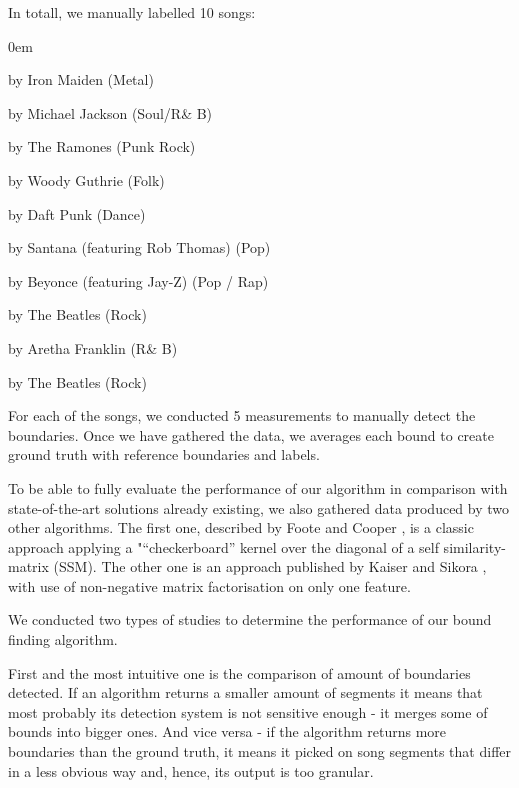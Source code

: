 In totall, we manually labelled 10 songs:
\vspace{-10pt}
\begin{description}
\itemsep0em 
\item[“The Number of The Beast”] by Iron Maiden (Metal)
\item[“Rock With You”] by Michael Jackson (Soul/R\& B)
\item[“Blitzkrieg Bop”] by The Ramones (Punk Rock)
\item[“This Land is Your Land“] by Woody Guthrie (Folk)
\item[“One More Time”] by Daft Punk (Dance)
\item[“Smooth”] by Santana (featuring Rob Thomas) (Pop)
\item[ “Crazy in Love”] by Beyonce (featuring Jay-Z) (Pop / Rap)
\item["Help!"] by The Beatles (Rock)
\item["Respect"] by Aretha Franklin (R\& B)
\item["Back in the USSR"] by The Beatles (Rock)
\end{description}

For each of the songs, we conducted 5 measurements to manually detect the boundaries. Once we have gathered the data, we averages each bound to create ground truth with reference boundaries and labels.

To be able to fully evaluate the performance of our algorithm in comparison with state-of-the-art solutions already existing, we also gathered data produced by two other algorithms. The first one, described by Foote and Cooper \cite{FooteCooper}, is a classic approach applying a "“checkerboard” kernel over the diagonal of a self similarity-matrix (SSM). The other one is an approach published by Kaiser and Sikora \cite{Sikora}, with use of non-negative matrix factorisation on only one feature. 

We conducted two types of studies to determine the performance of our bound finding algorithm.

First and the most intuitive one is the comparison of amount of boundaries detected. If an algorithm returns a smaller amount of segments it means that most probably its detection system is not sensitive enough - it merges some of bounds into bigger ones. And vice versa - if the algorithm returns more boundaries than the ground truth, it means it picked on song segments that differ in a less obvious way and, hence, its output is too granular.


